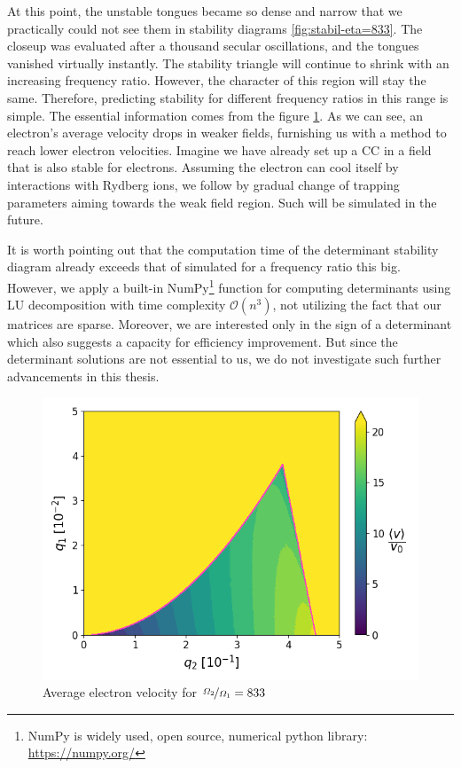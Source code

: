 At this point, the unstable tongues became so dense and narrow that we practically could not see them in stability diagrams \ref{fig:stabil-eta=833}. The closeup was evaluated after a thousand secular oscillations, and the tongues vanished virtually instantly. The stability triangle will continue to shrink with an increasing frequency ratio. However, the character of this region will stay the same. Therefore, predicting stability for different frequency ratios in this range is simple. The essential information comes from the figure \ref{fig:vel-eta=833}. As we can see, an electron's average velocity drops in weaker fields, furnishing us with a method to reach lower electron velocities. Imagine we have already set up a CC in a field that is also stable for electrons. Assuming the electron can cool itself by interactions with Rydberg ions, we follow by gradual change of trapping parameters aiming towards the weak field region. Such will be simulated in the future.

It is worth pointing out that the computation time of the determinant stability diagram already exceeds that of simulated for a frequency ratio this big. However, we apply a built-in NumPy\footnote{NumPy is widely used, open source, numerical python library: \href{https://numpy.org}{https://numpy.org/}} function for computing determinants using LU decomposition \cite{teukolsky1992numerical} with time complexity $\mathcal{O}(n^3)$, not utilizing the fact that our matrices are sparse. Moreover, we are interested only in the sign of a determinant which also suggests a capacity for efficiency improvement. But since the determinant solutions are not essential to us, we do not investigate such further advancements in this thesis.

\begin{figure}[H]
	\centering
	\includegraphics[width=\linewidth]{img/0_ions_1_electrons_q1_0.0-0.05_q2_0.0-0.5_960x960_833_1000.png}
	\caption{Average electron velocity for $\nicefrac{\Omega_2}{\Omega_1} = 833$}
	\label{fig:vel-eta=833}
\end{figure}

